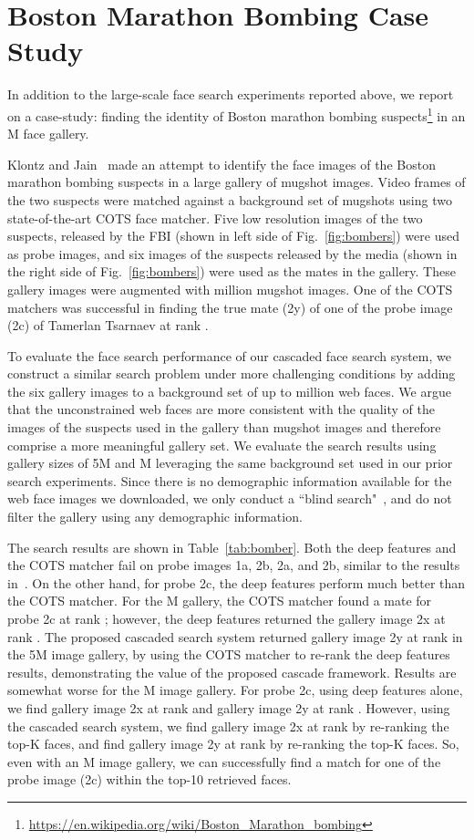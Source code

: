 \documentclass[10pt,journal,compsoc]{IEEEtran}
\begin{document}
\section{Boston Marathon Bombing Case Study}
In addition to the large-scale face search experiments reported above, we report on a case-study: finding the identity of Boston marathon bombing suspects\footnote{\url{https://en.wikipedia.org/wiki/Boston_Marathon_bombing}} in an M face gallery.

Klontz and Jain~\cite{faceretrieval:bomber} made an attempt to identify the face images of the Boston marathon bombing suspects in a large gallery of mugshot images. Video frames of the two suspects were matched against a background set of mugshots using two state-of-the-art COTS face matcher. Five low resolution images of the two suspects, released by the FBI (shown in left side of Fig.~\ref{fig:bombers}) were used as probe images, and six images of the suspects released by the media (shown in the right side of Fig.~\ref{fig:bombers}) were used as the mates in the gallery. These gallery images were augmented with  million mugshot images. One of the COTS matchers was successful in finding the true mate (2y) of one of  the probe image (2c) of Tamerlan Tsarnaev at rank .

To evaluate the face search performance of our cascaded face search system, we construct a similar search problem under more challenging conditions by adding the six gallery images to a background set of up to  million web faces. We argue that the unconstrained web faces are more consistent with the quality of the images of the suspects used in the gallery than mugshot images and therefore comprise a more meaningful gallery set. We evaluate the search results using gallery sizes of 5M and M leveraging the same background set used in our prior search experiments. Since there is no demographic information available for the web face images we downloaded, we only conduct a ``blind search"~\cite{faceretrieval:bomber}, and do not filter the gallery using any demographic information.

The search results are shown in Table~\ref{tab:bomber}. Both the deep features and the COTS matcher fail on probe images 1a, 2b, 2a, and 2b, similar to the results in~\cite{faceretrieval:bomber}. On the other hand, for probe 2c, the deep features perform much better than the COTS matcher. For the M gallery, the COTS matcher found a mate for probe 2c at rank ; however, the deep features returned the gallery image 2x at rank . The proposed cascaded search system returned gallery image 2y at rank  in the 5M image gallery, by using the COTS matcher to re-rank the deep features results, demonstrating the value of the proposed cascade framework. Results are somewhat worse for the M image gallery. For probe 2c, using deep features alone, we find gallery image 2x at rank  and gallery image 2y at rank . However, using the cascaded search system, we find gallery image 2x at rank  by re-ranking the top-K faces, and find gallery image 2y at rank  by re-ranking the top-K faces. So, even with an M image gallery, we can successfully find a match for one of the probe image (2c) within the top-10 retrieved faces.
\end{document}
